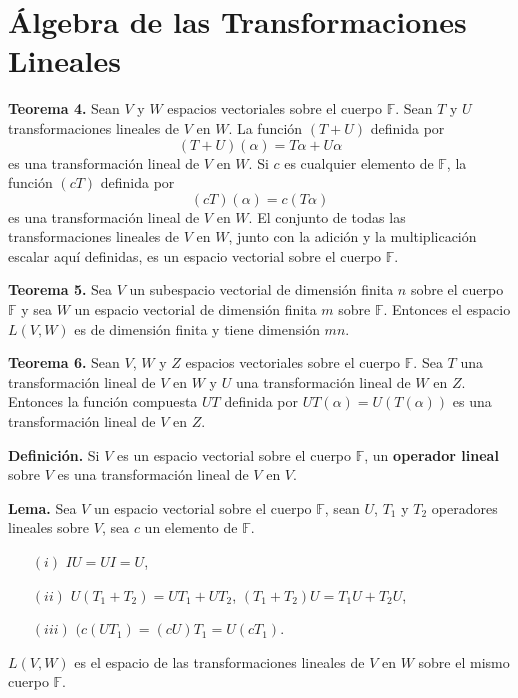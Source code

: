 \newpage
\section{{\large Álgebra de las Transformaciones Lineales}}
\textbf{Teorema 4.} Sean $V$ y $W$ espacios vectoriales sobre el
cuerpo $\mathbb{F}$. Sean $T$ y $U$ transformaciones lineales de
$V$ en $W$. La función $(T + U)$ definida por
$$(T + U)(\alpha) = T\alpha + U\alpha$$
es una transformación lineal de $V$ en $W$. Si $c$ es cualquier
elemento de $\mathbb{F}$, la función $(cT)$ definida por
$$(cT)(\alpha) = c(T\alpha)$$
es una transformación lineal de $V$ en $W$. El conjunto de
todas las transformaciones lineales de $V$ en $W$, junto con
la adición y la multiplicación escalar aquí definidas,
es un espacio vectorial sobre el cuerpo $\mathbb{F}$.

\textbf{Teorema 5.} Sea $V$ un subespacio vectorial de dimensión
finita $n$ sobre el cuerpo $\mathbb{F}$ y sea $W$ un espacio
vectorial de dimensión finita $m$ sobre $\mathbb{F}$. Entonces
el espacio $L(V, W)$ es de dimensión finita y tiene dimensión $mn$.

\textbf{Teorema 6.} Sean $V$, $W$ y $Z$ espacios vectoriales sobre
el cuerpo $\mathbb{F}$. Sea $T$ una transformación lineal de $V$ en
$W$ y $U$ una transformación lineal de $W$ en $Z$. Entonces la
función compuesta $UT$ definida por $UT(\alpha) = U(T(\alpha))$ es
una transformación lineal de $V$ en $Z$.

\textbf{Deﬁnición.}
Si $V$ es un espacio vectorial sobre el cuerpo $\mathbb{F}$,
un \textbf{operador lineal} sobre $V$ es una transformación
lineal de $V$ en $V$.

\textbf{Lema.} Sea $V$ un espacio vectorial sobre el
cuerpo $\mathbb{F}$, sean $U$, $T_{1}$ y $T_{2}$ operadores
lineales sobre $V$, sea $c$ un elemento de $\mathbb{F}$.
\begin{itemize}
    \item[$(i)$] $IU = UI = U$,
    \item[$(ii)$] $U(T_{1} + T_{2}) = UT_{1} + UT_{2}$, $(T_{1} + T_{2})U = T_{1}U + T_{2}U$,
    \item[$(iii)$] $(c(UT_{1}) = (cU)T_{1} = U(cT_{1})$.
\end{itemize}

\vfill
{\footnotesize{ $L(V, W)$ es el espacio de las transformaciones
lineales de $V$ en $W$ sobre el mismo cuerpo  $\mathbb{F}$.}}